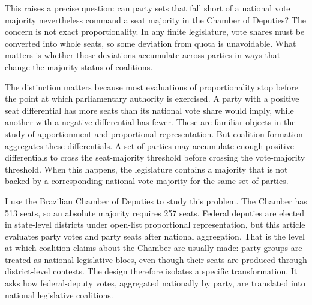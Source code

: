 \documentclass[11pt]{article}
\begin{document}
This raises a precise question: can party sets that fall short of a national vote majority nevertheless command a seat majority in the Chamber of Deputies? The concern is not exact proportionality. In any finite legislature, vote shares must be converted into whole seats, so some deviation from quota is unavoidable. What matters is whether those deviations accumulate across parties in ways that change the majority status of coalitions.

The distinction matters because most evaluations of proportionality stop before
the point at which parliamentary authority is exercised. A party with a positive
seat differential has more seats than its national vote share would imply, while
another with a negative differential has fewer. These are familiar objects in
the study of apportionment and proportional representation. But coalition
formation aggregates these differentials. A set of parties may accumulate enough
positive differentials to cross the seat-majority threshold before crossing the
vote-majority threshold. When this happens, the legislature contains a majority
that is not backed by a corresponding national vote majority for the same set of
parties.

I use the Brazilian Chamber of Deputies to study this problem. The Chamber has
513 seats, so an absolute majority requires 257 seats. Federal deputies are
elected in state-level districts under open-list proportional representation, but
this article evaluates party votes and party seats after national aggregation.
That is the level at which coalition claims about the Chamber are usually made:
party groups are treated as national legislative blocs, even though their seats
are produced through district-level contests. The design therefore isolates a
specific transformation. It asks how federal-deputy votes, aggregated nationally
by party, are translated into national legislative coalitions.
\end{document}
